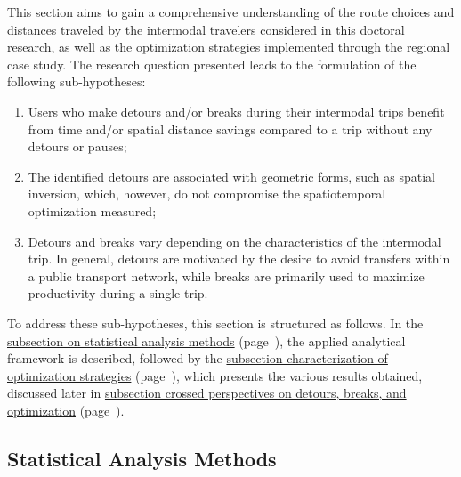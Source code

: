 \begin{refsegment}
This section aims to gain a comprehensive understanding of the route choices and distances traveled by the intermodal travelers considered in this doctoral research, as well as the optimization strategies implemented through the regional case study. The research question presented leads to the formulation of the following sub-hypotheses:
\begin{enumerate}
    \item Users who make detours and/or breaks during their intermodal trips benefit from time and/or spatial distance savings compared to a trip without any detours or pauses;
    \item The identified detours are associated with geometric forms, such as spatial inversion, which, however, do not compromise the spatiotemporal optimization measured;
    \item Detours and breaks vary depending on the characteristics of the intermodal trip. In general, detours are motivated by the desire to avoid transfers within a public transport network, while breaks are primarily used to maximize productivity during a single trip.
\end{enumerate}%
    
To address these sub-hypotheses, this section is structured as follows. In the \hyperref[chap5:methodes-statistiques]{subsection on statistical analysis methods} (page~\pageref{chap5:methodes-statistiques}), the applied analytical framework is described, followed by the \hyperref[chap5:strategies-optimisation]{subsection characterization of optimization strategies} (page~\pageref{chap5:strategies-optimisation}), which presents the various results obtained, discussed later in \hyperref[chap5:discussion-detours-pauses-optimisation]{subsection crossed perspectives on detours, breaks, and optimization} (page~\pageref{chap5:discussion-detours-pauses-optimisation}).%

\subsection{Statistical Analysis Methods
    \label{chap5:methodes-statistiques}
    }


\end{refsegment}
